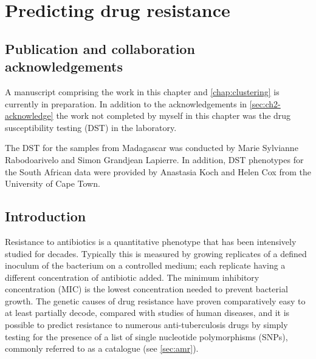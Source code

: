 \chapter{Predicting \mtb{} drug resistance}
\label{chap:dst}
\ifpdf
    \graphicspath{{Chapter3/Figs/Raster/}{Chapter3/Figs/PDF/}{Chapter3/Figs/}}
\else
    \graphicspath{{Chapter3/Figs/Vector/}{Chapter3/Figs/}}
\fi


\setcounter{section}{-1}
\section{Publication and collaboration acknowledgements}
\label{sec:ch3-acknowledge}

A manuscript comprising the work in this chapter and \autoref{chap:clustering} is currently in preparation. In addition to the acknowledgements in \autoref{sec:ch2-acknowledge} the work not completed by myself in this chapter was the drug susceptibility testing (DST) in the laboratory.

The DST for the samples from Madagascar was conducted by Marie Sylvianne Rabodoarivelo and Simon Grandjean Lapierre. In addition, DST phenotypes for the South African data were provided by Anastasia Koch and Helen Cox from the University of Cape Town.

\section{Introduction}

Resistance to antibiotics is a quantitative phenotype that has been intensively studied for decades. Typically this is measured by growing replicates of a defined inoculum of the bacterium on a controlled medium; each replicate having a different concentration of antibiotic added. The minimum inhibitory concentration (MIC) is the lowest concentration needed to prevent bacterial growth. The genetic causes of drug resistance have proven comparatively easy to at least partially decode, compared with studies of human diseases, and it is possible to predict resistance to numerous anti-tuberculosis drugs by simply testing for the presence of a list of single nucleotide polymorphisms (SNPs), commonly referred to as a catalogue (see \autoref{sec:amr}).

